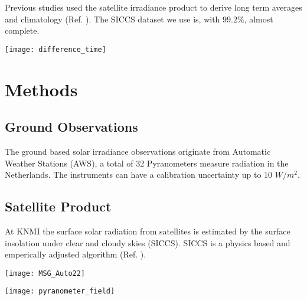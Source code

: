 \documentclass[]{article}
\begin{document}
Previous studies used the satellite irradiance product to derive long term averages and climatology (Ref. \cite{Huld2012}). The SICCS dataset we use is, with $99.2\%$, almost complete.

\begin{tcolorbox}[colback=red!5!white,colframe=red!75!black,title=Differences between SICCS and ground observations]
\vspace{1em}
\begin{minipage}[b]{\columnwidth}
	\begin{center}
		\texttt{[image: difference\_time]}
		\label{fig:difftime}
	\end{center}
\end{minipage}
\end{tcolorbox}


\section*{Methods}
\subsection*{Ground Observations}
The ground based solar irradiance observations originate from Automatic Weather Stations (AWS), a total of 32 Pyranometers measure radiation in the Netherlands. The instruments can have a calibration uncertainty up to 10 $W/m^2$. 

\subsection*{Satellite Product}
At KNMI the surface solar radiation from satellites is estimated by the surface insolation under clear and cloudy skies (SICCS). SICCS is a physics based and emperically adjusted algorithm (Ref. \cite{Greuell2013}). 

\vspace{20pt plus 10pt minus 5pt}
\begin{minipage}[b]{\columnwidth}
	\begin{center}
		\begin{minipage}[b]{0.45\columnwidth}
			\centering
			\texttt{[image: MSG\_Auto22]}
			\label{fig:figure1}
		\end{minipage}
		\hspace{0.5cm}
		\begin{minipage}[b]{0.45\columnwidth}
			\centering
			\texttt{[image: pyranometer\_field]}
			\label{fig:figure2}
		\end{minipage}
	\end{center}
\end{minipage}
\end{document}
